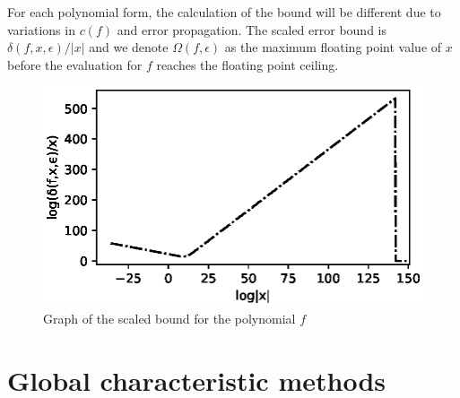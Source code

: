 \documentclass[]{elsarticle}
\begin{document}
For each polynomial form, the calculation of the bound will be different due to variations in $c(f)$ and error propagation. 
The scaled error bound is $\delta(f,x,\epsilon)/|x|$
and we denote $\Omega(f,\epsilon)$ as the maximum floating point value of $x$ before the evaluation for $f$ reaches the floating point ceiling.

\begin{figure}[ht]
	\centering
	\caption{Graph of the scaled bound for the polynomial $f$}
	\includegraphics[width=0.54\linewidth]{figs/graph}
\end{figure}

\section{Global characteristic methods}
\end{document}
